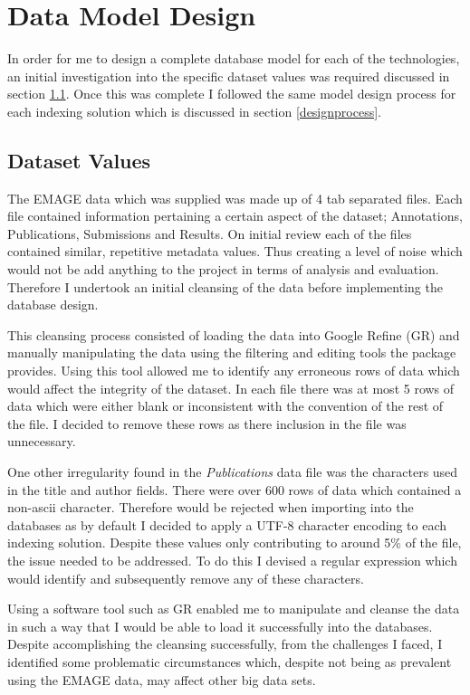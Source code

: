 \chapter{Data Model Design}\label{design}

In order for me to design a complete database model for each of the technologies, an initial investigation into the specific dataset values was required discussed in section \ref{datasetvalues}. Once this was complete I followed the same model design process for each indexing solution which is discussed in section \ref{designprocess}.

\section{Dataset Values}\label{datasetvalues}

The EMAGE data which was supplied was made up of 4 tab separated files. Each file contained information pertaining a certain aspect of the dataset; Annotations, Publications, Submissions and Results. On initial review each of the files contained similar, repetitive metadata values. Thus creating a level of noise which would not be add anything to the project in terms of analysis and evaluation. Therefore I undertook an initial cleansing of the data before implementing the database design.

This cleansing process consisted of loading the data into Google Refine (GR) and manually manipulating the data using the filtering and editing tools the package provides. Using this tool allowed me to identify any erroneous rows of data which would affect the integrity of the dataset. In each file there was at most 5 rows of data which were either blank or inconsistent with the convention of the rest of the file. I decided to remove these rows as there inclusion in the file was unnecessary.

One other irregularity found in the \textit{Publications} data file was the characters used in the title and author fields. There were over 600 rows of data which contained a non-ascii character. Therefore would be rejected when importing into the databases as by default I decided to apply a UTF-8 character encoding to each indexing solution. Despite these values only contributing to around 5\% of the file, the issue needed to be addressed. To do this I devised a regular expression which would identify and subsequently remove any of these characters.

Using a software tool such as GR enabled me to manipulate and cleanse the data in such a way that I would be able to load it successfully into the databases. Despite accomplishing the cleansing successfully, from the challenges I faced, I identified some problematic circumstances which, despite not being as prevalent using the EMAGE data, may affect other big data sets.

